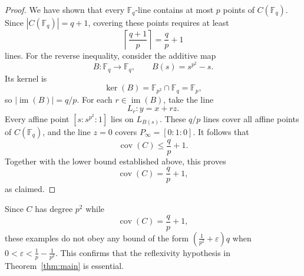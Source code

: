 \documentclass[10pt,a4paper]{amsart}
\theoremstyle{definition}
\theoremstyle{remark}
\newcommand{\bF}{\mathbb{F}}
\newcommand{\Fp}{\mathbb{F}_p}
\newcommand{\Fq}{\mathbb{F}_q}
\begin{document}
\begin{proof}
We have shown that every $\Fq$-line contains at most $p$ points of $C(\Fq)$. Since $|C(\Fq)|=q+1$, covering these points requires at least
\[
\left\lceil\frac{q+1}{p}\right\rceil = \frac{q}{p}+1
\]
lines. For the reverse inequality, consider the additive map
\[
B\colon\Fq\longrightarrow\Fq,
\qquad B(s)=s^{p^2}-s.
\]
Its kernel is
\[
\ker(B) = \bF_{p^2}\cap\Fq = \Fp,
\]
so $|\operatorname{im}(B)|=q/p$. For each $r\in\operatorname{im}(B)$, take the line
\[
L_r\colon y=x+rz.
\]
Every affine point $[s:s^{p^2}:1]$ lies on $L_{B(s)}$. These $q/p$ lines cover all affine points of $C(\Fq)$, and the line $z=0$ covers $P_\infty=[0:1:0]$. It follows that
\[
\operatorname{cov}(C)\leq\frac{q}{p}+1.
\]
Together with the lower bound established above, this proves
\[
\operatorname{cov}(C)=\frac{q}{p}+1,
\]
as claimed. \end{proof}

Since $C$ has degree $p^2$ while
\[
\operatorname{cov}(C)=\frac{q}{p}+1,
\]
these examples do not obey any bound of the form
$\left(\frac{1}{p^2}+\varepsilon\right)q$ when
$0<\varepsilon<\frac{1}{p}-\frac{1}{p^2}$. This confirms that the reflexivity hypothesis in Theorem~\ref{thm:main} is essential.
\end{document}
